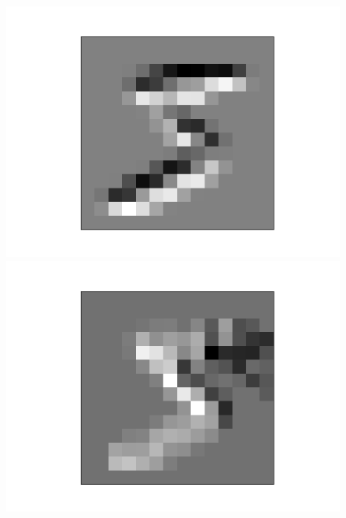 \documentclass{article}
\begin{document}
\begin{figure}[h]
\begin{minipage}{0.2\linewidth}
	\includegraphics[width=\linewidth]{../graphics/mnist_5/conv_pool/upper_horiz_avgpooled.png}
\end{minipage}
\hfill
\begin{minipage}{0.2\linewidth}
	\centering
	\includegraphics[width=\linewidth]{../graphics/mnist_5/conv_pool/left_vert_avgpooled.png}
\end{minipage}
\hfill
\begin{minipage}{0.2\linewidth}
	\centering

\end{minipage}
\end{figure}
\end{document}
